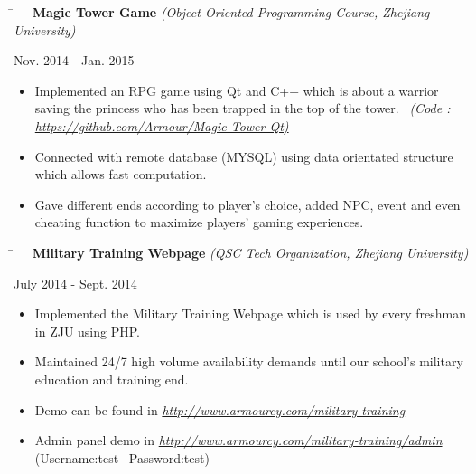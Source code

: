 \documentclass[10pt]{article} %
\begin{document}
\parbox{0.5\textwidth}{
\begin{tabbing}
\hspace{4mm} \= \kill
\>\textbf{\ \ Magic Tower Game} \textit{(Object-Oriented Programming Course, Zhejiang University)}
\end{tabbing}
}
\hfill
\parbox{0.5\textwidth}{
\begin{tabbing}
Nov. 2014 - Jan. 2015
\end{tabbing}
}
\vspace{-3mm}
\begin{itemize}[leftmargin=16mm]
        \item Implemented an RPG game using Qt and C++ which is about a warrior saving the princess who has been trapped in the top of the tower. \ \textit{(Code : \underline{https://github.com/Armour/Magic-Tower-Qt)}}
        \item Connected with remote database (MYSQL) using data orientated structure which allows fast computation.
        \item Gave different ends according to player's choice, added NPC, event and even cheating function to maximize players' gaming experiences. 

\end{itemize}

\parbox{0.5\textwidth}{
\begin{tabbing}
\hspace{4mm} \= \kill
\>\textbf{\ \ Military Training Webpage} \textit{(QSC Tech Organization, Zhejiang University)}
\end{tabbing}
}
\hfill
\parbox{0.5\textwidth}{
\begin{tabbing}
July 2014 - Sept. 2014
\end{tabbing}
}
\vspace{-3mm}
\begin{itemize}[leftmargin=16mm]
        \item Implemented the Military Training Webpage which is used by every freshman in ZJU using PHP.
        \item Maintained 24/7 high volume availability demands until our school's military education and training end.
        \item Demo can be found in \textit{\underline{http://www.armourcy.com/military-training}}
        \item Admin panel demo in \textit{\underline{http://www.armourcy.com/military-training/admin}} (Username:test \  Password:test)
\end{itemize}
\end{document}
